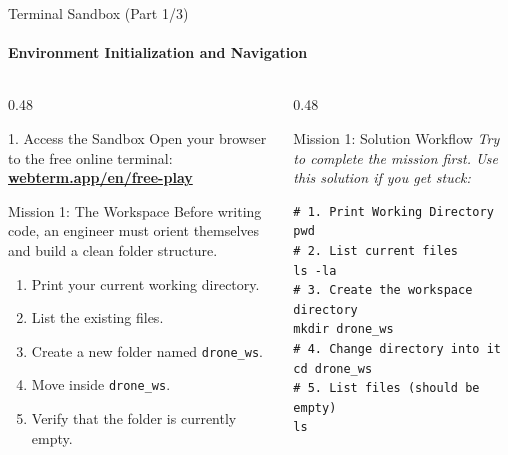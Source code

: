 \begin{frame}[fragile]{Terminal Sandbox (Part 1/3)}
\framesubtitle{Environment Initialization and Navigation}

\footnotesize

\begin{columns}[T,onlytextwidth]

    \begin{column}{0.48\textwidth}
        \begin{block}{1. Access the Sandbox}
            Open your browser to the free online terminal:
            \vspace{0.1cm} \\
            \textbf{\href{https://webterm.app/en/free-play}{\color{um6p-color-dark-blue}webterm.app/en/free-play}}
        \end{block}

        \begin{exampleblock}{Mission 1: The Workspace}
            Before writing code, an engineer must orient themselves and build a clean folder structure.
            \begin{enumerate}
                \setlength{\itemsep}{0.2em}
                \item Print your current working directory.
                \item List the existing files.
                \item Create a new folder named \texttt{drone\_ws}.
                \item Move inside \texttt{drone\_ws}.
                \item Verify that the folder is currently empty.
            \end{enumerate}
        \end{exampleblock}
    \end{column}

    \pause
    \begin{column}{0.48\textwidth}
        \begin{block}{Mission 1: Solution Workflow}
            \textit{Try to complete the mission first. Use this solution if you get stuck:}
            
\begin{verbatim}
# 1. Print Working Directory
pwd
# 2. List current files
ls -la
# 3. Create the workspace directory
mkdir drone_ws
# 4. Change directory into it
cd drone_ws
# 5. List files (should be empty)
ls
\end{verbatim}
        \end{block}
    \end{column}

\end{columns}
\end{frame}


